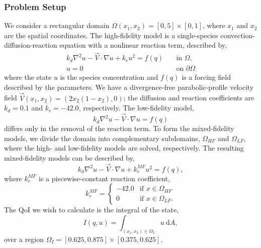 \subsubsection{Problem Setup} \label{sec:cdvcdrSetup}
%
We consider a rectangular domain $\Omega(x_1,x_2)=[0,5]\times[0,1]$, where $x_1$ and $x_2$ are the spatial coordinates. The high-fidelity model is a single-species convection-diffusion-reaction equation with a nonlinear reaction term, described by,
%
\begin{subequations}
\label{eq:cdvcdrHF}
\begin{align}
k_d\nabla^2 u - \vec{V}\cdot\nabla u + k_ru^2 = f(q) \quad &\text{in } \Omega, \label{eq:cdvcdrHF_int} \\
u = 0 \quad &\text{on } \partial \Omega \label{eq:cdvcdrHF_bdry}
\end{align} 
\end{subequations}
%
where the state $u$ is the species concentration and $f(q)$ is a forcing field described by the parameters. We have a divergence-free parabolic-profile velocity field $\vec{V}(x_1,x_2) = (2x_2(1-x_2),0)$; the diffusion and reaction coefficients are $k_d = 0.1$ and $k_r = -42.0$, respectively. The low-fidelity model,
%
\begin{equation}
k_d\nabla^2 u - \vec{V}\cdot\nabla u = f(q)
\end{equation}
%
differs only in the removal of the reaction term. To form the mixed-fidelity models, we divide the domain into complementary subdomains, $\Omega_{HF}$ and $\Omega_{LF}$, where the high- and low-fidelity models are solved, respectively. The resulting mixed-fidelity models can be described by, 
%
\begin{equation}
k_d\nabla^2 u - \vec{V}\cdot\nabla u + k^{MF}_ru^2= f(q),
\end{equation}
%
where $k^{MF}_r$ is a piecewise-constant reaction coefficient,
%
\begin{equation}
k^{MF}_r=
\begin{cases}
-42.0 & \textrm{if }x\in\Omega_{HF} \\
0 & \textrm{if }x\in\Omega_{LF}.
\end{cases}
\end{equation}
%
The QoI we wish to calculate is the integral of the state,
%
\begin{equation}
I(q,u)=\int_{(x_1,x_2)\in \Omega_I} u \:\textrm{d}A,
\end{equation}
%
over a region $\Omega_I=[0.625,0.875]\times[0.375,0.625]$. 

